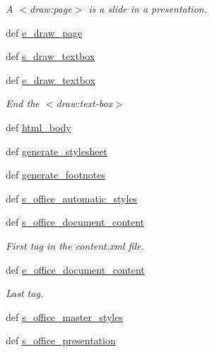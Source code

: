\begin{DoxyCompactItemize}
\begin{DoxyCompactList}\small\item\em A $<$draw\+:page$>$ is a slide in a presentation. \end{DoxyCompactList}\item 
def \hyperlink{classodf_1_1odf2xhtml_1_1ODF2XHTML_a9a816bc717f72330823785e2b6839200}{e\+\_\+draw\+\_\+page}
\item 
def \hyperlink{classodf_1_1odf2xhtml_1_1ODF2XHTML_ad4b4535781d6d7e5c8f265fe98c131fb}{s\+\_\+draw\+\_\+textbox}
\item 
def \hyperlink{classodf_1_1odf2xhtml_1_1ODF2XHTML_a5f4858d7be871707f4c61b48c3c21fc4}{e\+\_\+draw\+\_\+textbox}
\begin{DoxyCompactList}\small\item\em End the $<$draw\+:text-\/box$>$ \end{DoxyCompactList}\item 
def \hyperlink{classodf_1_1odf2xhtml_1_1ODF2XHTML_a803832f31cfdfeea1c4adf7a64c685cb}{html\+\_\+body}
\item 
def \hyperlink{classodf_1_1odf2xhtml_1_1ODF2XHTML_a4a1ec5042410a956f416d2843a220b3a}{generate\+\_\+stylesheet}
\item 
def \hyperlink{classodf_1_1odf2xhtml_1_1ODF2XHTML_a6f209dc272b2df70f9556178c8d8db97}{generate\+\_\+footnotes}
\item 
def \hyperlink{classodf_1_1odf2xhtml_1_1ODF2XHTML_a45fc529be927acd7bf87d5516d063256}{s\+\_\+office\+\_\+automatic\+\_\+styles}
\item 
def \hyperlink{classodf_1_1odf2xhtml_1_1ODF2XHTML_aacc6d73e15788899020cdb1b36fe6f9a}{s\+\_\+office\+\_\+document\+\_\+content}
\begin{DoxyCompactList}\small\item\em First tag in the content.\+xml file. \end{DoxyCompactList}\item 
def \hyperlink{classodf_1_1odf2xhtml_1_1ODF2XHTML_a6563a63a5fa1849ba1936ca22b88dcad}{e\+\_\+office\+\_\+document\+\_\+content}
\begin{DoxyCompactList}\small\item\em Last tag. \end{DoxyCompactList}\item 
def \hyperlink{classodf_1_1odf2xhtml_1_1ODF2XHTML_acccf7cc6c32933e21b51bdecc90cfad5}{s\+\_\+office\+\_\+master\+\_\+styles}
\item 
def \hyperlink{classodf_1_1odf2xhtml_1_1ODF2XHTML_a1e48d9dbb25393afd87f020a1c748e2e}{s\+\_\+office\+\_\+presentation}

\end{DoxyCompactItemize}

